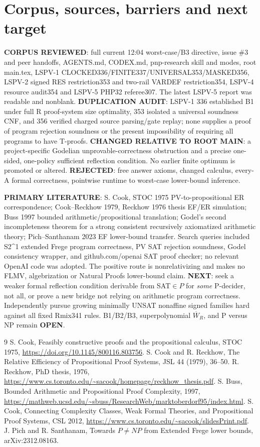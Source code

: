 \documentclass[11pt]{article}
\begin{document}
\section*{Corpus, sources, barriers and next target}
\noindent\textbf{CORPUS REVIEWED}: full current 12:04 worst-case/B3 directive, issue \#3 and peer handoffs, AGENTS.md, CODEX.md, pnp-research skill and modes, root main.tex, LSPV-1 CLOCKED336/FINITE337/UNIVERSAL353/MASKED356, LSPV-2 signed RES restriction353 and two-rail VARDEF restriction354, LSPV-4 resource audit354 and LSPV-5 PHP32 referee307. The latest LSPV-5 report was readable and nonblank. \textbf{DUPLICATION AUDIT}: LSPV-1 336 established B1 under full R proof-system size optimality, 353 isolated a universal soundness CNF, and 356 verified charged source parsing/gate replay; none supplies a proof of program rejection soundness or the present impossibility of requiring all programs to have T-proofs. \textbf{CHANGED RELATIVE TO ROOT MAIN}: a project-specific Godelian unprovable-correctness obstruction and a precise one-sided, one-policy sufficient reflection condition. No earlier finite optimum is promoted or altered. \textbf{REJECTED}: free answer axioms, changed calculus, every-A formal correctness, pointwise runtime to worst-case lower-bound inference.

\noindent\textbf{PRIMARY LITERATURE}: S. Cook, STOC 1975 PV-to-propositional ER correspondence; Cook--Reckhow 1979, Reckhow 1976 thesis EF/ER simulation; Buss 1997 bounded arithmetic/propositional translation; Godel's second incompleteness theorem for a strong consistent recursively axiomatized arithmetic theory; Pich--Santhanam 2023 EF lower-bound transfer. Search queries included S2^1 extended Frege program correctness, PV SAT rejection soundness, Godel consistency wrapper, and github.com/openai SAT proof checker; no relevant OpenAI code was adopted. The positive route is nonrelativizing and makes no FLMV, algebrization or Natural Proofs lower-bound claim. \textbf{NEXT}: seek a weaker formal reflection condition derivable from SAT$\in P$ for \emph{some} P-decider, not all, or prove a new bridge not relying on arithmetic program correctness. Independently pursue growing minimally UNSAT nonaffine signed families hard against all fixed Rmix341 rules. B1/B2/B3, superpolynomial $\overline W_R$, and P versus NP remain \textbf{OPEN}.

\begin{thebibliography}{9}
 S. Cook, Feasibly constructive proofs and the propositional calculus, STOC 1975, \url{https://doi.org/10.1145/800116.803756}.
 S. Cook and R. Reckhow, The Relative Efficiency of Propositional Proof Systems, JSL 44 (1979), 36--50.
 R. Reckhow, PhD thesis, 1976, \url{https://www.cs.toronto.edu/~sacook/homepage/reckhow_thesis.pdf}.
 S. Buss, Bounded Arithmetic and Propositional Proof Complexity, 1997, \url{https://mathweb.ucsd.edu/~sbuss/ResearchWeb/marktoberdorf95/index.html}.
 S. Cook, Connecting Complexity Classes, Weak Formal Theories, and Propositional Proof Systems, CSL 2012, \url{https://www.cs.toronto.edu/~sacook/slidesPrint.pdf}.
 J. Pich and R. Santhanam, Towards $P\ne NP$ from Extended Frege lower bounds, arXiv:2312.08163.
\end{thebibliography}
\end{document}

